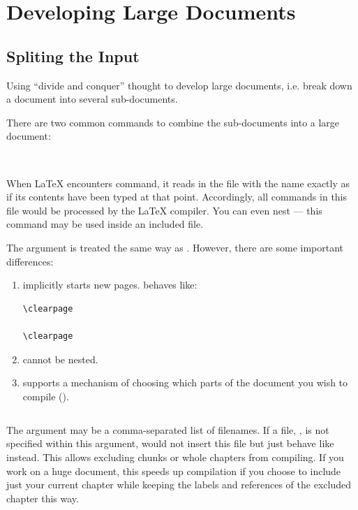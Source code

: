
\chapter{Developing Large Documents}
\label{cha:devel-large-docum}


\section{Spliting the Input}
\label{sec:spliting-input}


Using ``divide and conquer'' thought to develop large documents, i.e. break down a document into several sub-documents.

There are two common commands to combine the sub-documents into a large document:
\begin{lstlisting}


\end{lstlisting}

When LaTeX encounters \lstinline|| command, it reads in the file with the name  exactly as if its contents have been typed at that point.
Accordingly, all commands in this file would be processed by the LaTeX compiler.
You can even nest \lstinline|| — this command may be used inside an included file.

The argument is treated the same way as \lstinline||.
However, there are some important differences:
\begin{enumerate}
\item \lstinline|| implicitly starts new pages. \lstinline|| behaves like:
\begin{lstlisting}
\clearpage

\clearpage
\end{lstlisting}
  
\item \lstinline|| cannot be nested.

\item \lstinline|| supports a mechanism of choosing which parts of the document you wish to compile (\lstinline||).
\end{enumerate}


\begin{lstlisting}

\end{lstlisting}

The argument may be a comma-separated list of filenames.
If a file, , is not specified within this argument, \lstinline|| would not insert this file but just behave like \clearpage instead.
This allows excluding chunks or whole chapters from compiling.
If you work on a huge document, this speeds up compilation if you choose to include just your current chapter while keeping the labels and references of the excluded chapter this way.

